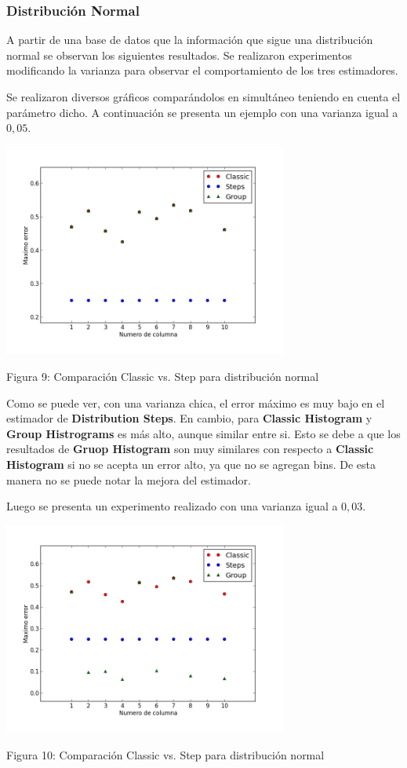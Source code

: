 \documentclass[10pt, a4paper,english,spanish,hidelinks]{article}
\begin{document}
\subsubsection{Distribución Normal}

A partir de una base de datos que la información que sigue una distribución normal se observan los siguientes resultados. Se realizaron experimentos modificando la varianza para observar el comportamiento de los tres estimadores.

Se realizaron diversos gráficos comparándolos en simultáneo teniendo en cuenta el parámetro dicho. 
A continuación se presenta un ejemplo con una varianza igual a $0,05$. 


\centerline{  \includegraphics[width=0.7\textwidth]{./imagenes/ejb2_normal_t_005.png}}
\centerline{ Figura 9: Comparación Classic vs. Step para distribución normal}


Como se puede ver, con una varianza chica, el error máximo es muy bajo en el estimador de \textbf{Distribution Steps}. En cambio, para \textbf{Classic Histogram} y \textbf{Group Histrograms} es más alto, aunque similar entre si. Esto se debe a que los resultados de \textbf{Gruop Histogram} son muy similares con respecto a \textbf{Classic Histogram} si no se acepta un error alto, ya que no se agregan bins. De esta manera no se puede notar la mejora del estimador.


Luego se presenta un experimento realizado con una varianza igual a $0,03$. 


\centerline{  \includegraphics[width=0.7\textwidth]{./imagenes/ejb2_normal_t_003.png}}
\centerline{ Figura 10: Comparación Classic vs. Step para distribución normal}
\end{document}
